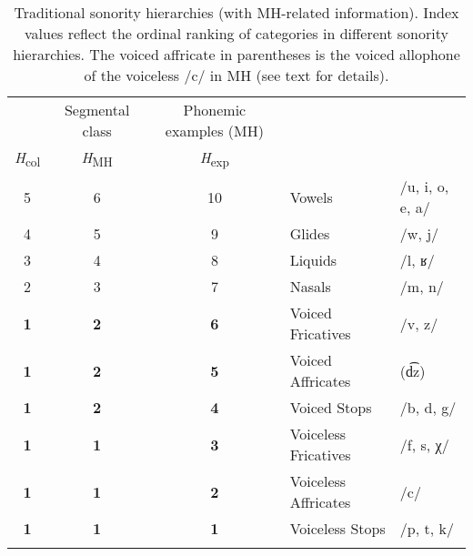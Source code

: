 \begin{table}
\caption{\label{tab:hierarchyMH}Traditional sonority hierarchies (with MH-related information). Index values reflect the ordinal ranking of categories in different sonority hierarchies. The voiced affricate in parentheses is the voiced allophone of the voiceless /c/ in MH (see text for details).}
\begin{tabular}{cccll}%
\lsptoprule
\multicolumn{3}{c}{{Sonority index}} & Segmental class & Phonemic examples (MH)\\\cmidrule(lr){1-3}
\multicolumn{1}{c}{\emph{H}\textsubscript{col}} & \multicolumn{1}{c}{\emph{H}\textsubscript{MH}} & \multicolumn{1}{c}{\emph{H}\textsubscript{exp}} & & \\\midrule
\multicolumn{1}{c}{5} & \multicolumn{1}{c}{6} & \multicolumn{1}{c}{10} & \multicolumn{1}{l}{Vowels} & \multicolumn{1}{l}{/u, i, o, e, a/}\\
\multicolumn{1}{c}{4} & \multicolumn{1}{c}{5} & \multicolumn{1}{c}{9} & \multicolumn{1}{l}{Glides} & \multicolumn{1}{l}{/w, j/}\\
\multicolumn{1}{c}{3} & \multicolumn{1}{c}{4} & \multicolumn{1}{c}{8} & \multicolumn{1}{l}{Liquids} & \multicolumn{1}{l}{/l, ʁ/}\\
\multicolumn{1}{c}{2} & \multicolumn{1}{c}{3} & \multicolumn{1}{c}{7} & \multicolumn{1}{l}{Nasals} & \multicolumn{1}{l}{/m, n/}\\
\multicolumn{1}{c}{\textbf{1}} & \multicolumn{1}{c}{\textbf{2}} & \multicolumn{1}{c}{\textbf{6}} & \multicolumn{1}{l}{Voiced Fricatives} & \multicolumn{1}{l}{/v, z/}\\
\multicolumn{1}{c}{\textbf{1}} & \multicolumn{1}{c}{\textbf{2}} & \multicolumn{1}{c}{\textbf{5}} & \multicolumn{1}{l}{Voiced Affricates} & \multicolumn{1}{l}{(d͡z)}\\
\multicolumn{1}{c}{\textbf{1}} & \multicolumn{1}{c}{\textbf{2}} & \multicolumn{1}{c}{\textbf{4}} & \multicolumn{1}{l}{Voiced Stops} & \multicolumn{1}{l}{/b, d, g/}\\
\multicolumn{1}{c}{\textbf{1}} & \multicolumn{1}{c}{\textbf{1}} & \multicolumn{1}{c}{\textbf{3}} & \multicolumn{1}{l}{Voiceless Fricatives} & \multicolumn{1}{l}{/f, s, χ/}\\
\multicolumn{1}{c}{\textbf{1}} & \multicolumn{1}{c}{\textbf{1}} & \multicolumn{1}{c}{\textbf{2}} & \multicolumn{1}{l}{Voiceless Affricates} & \multicolumn{1}{l}{/c/}\\
\multicolumn{1}{c}{\textbf{1}} & \multicolumn{1}{c}{\textbf{1}} & \multicolumn{1}{c}{\textbf{1}} & \multicolumn{1}{l}{Voiceless Stops} & \multicolumn{1}{l}{/p, t, k/}\\
\lspbottomrule
\end{tabular}
\end{table}


